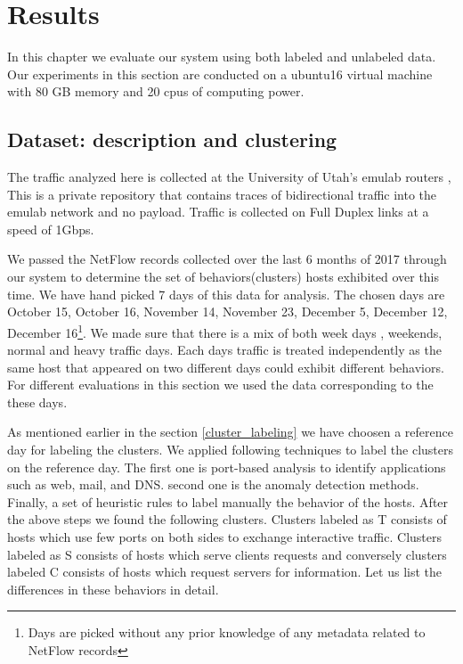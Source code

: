 
\chapter{Results}

In this chapter we evaluate our system using both labeled and unlabeled data. Our experiments in this section are conducted on a ubuntu16 virtual machine with 80 GB memory and 20 cpus of computing power. 

\section{Dataset: description and clustering}
The traffic analyzed here is collected at the University of Utah's emulab routers \cite{White+:osdi02}, This is a private repository that contains traces of bidirectional traffic into the emulab network and no payload. Traffic is collected on Full Duplex links at a speed of 1Gbps.

We passed the NetFlow records collected over the last 6 months of 2017 through our system to determine the set of behaviors(clusters) hosts exhibited over this time. We have hand picked 7 days of this data for analysis. The chosen days are October 15, October 16, November 14, November 23, December 5, December 12, December 16\footnote{Days are picked without any prior knowledge of any metadata related to NetFlow records}. We made sure that there is a mix of both week days , weekends, normal and heavy traffic days. Each days traffic is treated independently as the same host that appeared on two different days could exhibit different behaviors. For different evaluations in this section we used the data corresponding to the these days.

As mentioned earlier in the section \ref{cluster_labeling} we have choosen a reference day for labeling the clusters. We applied following techniques to label the clusters on the reference day. The first one is port-based analysis to identify applications such as web, mail, and DNS. second one is the anomaly detection methods. Finally, a set of heuristic rules to label manually the behavior of the hosts. After the above steps we found the following clusters. Clusters labeled as T consists of hosts which use few ports on both sides to exchange interactive traffic. Clusters labeled as S consists of hosts which serve clients requests and conversely clusters labeled C consists of hosts which request servers for information. Let us list the differences in these behaviors in detail.

